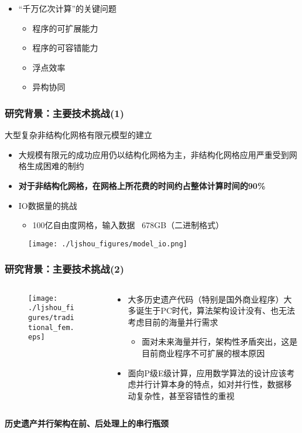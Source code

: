 \documentclass[mathserif]{beamer}
\begin{document}
\begin{CJK}{UTF8}{gkai}
\begin{frame}
\begin{itemize}
		\item “千万亿次计算”的关键问题
		   \begin{itemize}
			\item 程序的可扩展能力
			\item 程序的可容错能力
			\item 浮点效率
			\item 异构协同
		   \end{itemize}
	  \end{itemize}
	\end{frame}

	\begin{frame}
		\frametitle{研究背景：主要技术挑战(1)}
		大型复杂非结构化网格有限元模型的建立
		\begin{itemize}
		  \item 大规模有限元的成功应用仍以结构化网格为主，非结构化网格应用严重受到网格生成困难的制约
		  \item {\color{red}\bf 对于非结构化网格，在网格上所花费的时间约占整体计算时间的90\%}
		  \item IO数据量的挑战
		  \begin{itemize}
			\item 100亿自由度网格，输入数据 ~678GB（二进制格式）
		  \end{itemize}
		\end{itemize}
			\begin{figure}
				\centering
				\texttt{[image: ./ljshou\_figures/model\_io.png]}
			\end{figure}
	\end{frame}

	\begin{frame}
		\frametitle{研究背景：主要技术挑战(2)}
		\begin{columns}
			\begin{column}[pos]{0.4\textwidth}
				\begin{figure}
					\texttt{[image: ./ljshou\_figures/traditional\_fem.eps]}
				\end{figure}
			\end{column}
			
			\begin{column}[pos]{0.6\textwidth}
				\begin{itemize}
		  			\item 大多历史遗产代码（特别是国外商业程序）大多诞生于PC时代，算法架构设计没有、也无法考虑目前的海量并行需求
		  		\begin{itemize}
					\item 面对未来海量并行，架构性矛盾突出，这是目前商业程序不可扩展的根本原因
		  		\end{itemize}
		  		\item 面向P级E级计算，应用数学算法的设计应该考虑并行计算本身的特点，如对并行性，数据移动复杂性，甚至容错性的重视
		\end{itemize}
			\end{column}
		\end{columns}
		\begin{block}{}
			\color{red}\bf 历史遗产并行架构在前、后处理上的串行瓶颈
		\end{block}
	\end{frame}



\end{CJK}
\end{document}
